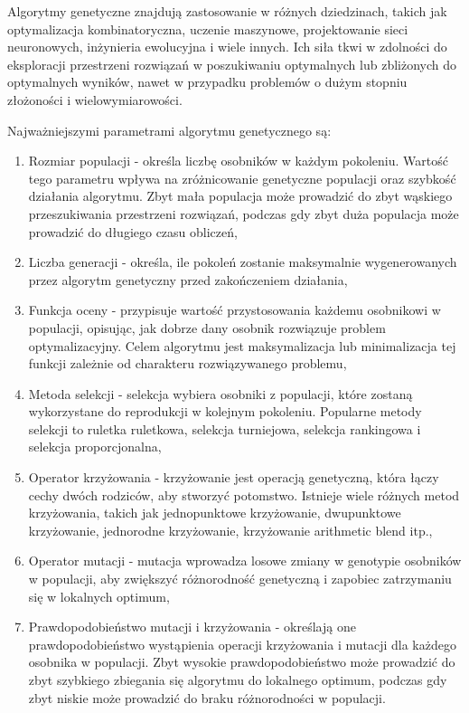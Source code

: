 \documentclass[12pt,twoside]{article}
\begin{document}
Algorytmy genetyczne znajdują zastosowanie w różnych dziedzinach, takich jak optymalizacja kombinatoryczna, uczenie maszynowe, projektowanie sieci neuronowych, inżynieria ewolucyjna i wiele innych. Ich siła tkwi w zdolności do eksploracji przestrzeni rozwiązań w poszukiwaniu optymalnych lub zbliżonych do optymalnych wyników, nawet w przypadku problemów o dużym stopniu złożoności i wielowymiarowości.

Najważniejszymi parametrami algorytmu genetycznego są:
\begin{enumerate}[label=\alph*), leftmargin=1.25cm]
	\item Rozmiar populacji - określa liczbę osobników w każdym pokoleniu. Wartość tego parametru wpływa na zróżnicowanie genetyczne populacji oraz szybkość działania algorytmu. Zbyt mała populacja może prowadzić do zbyt wąskiego przeszukiwania przestrzeni rozwiązań, podczas gdy zbyt duża populacja może prowadzić do długiego czasu obliczeń,
	
	\item Liczba generacji - określa, ile pokoleń zostanie maksymalnie wygenerowanych przez algorytm genetyczny przed zakończeniem działania,
	
	\item Funkcja oceny - przypisuje wartość przystosowania każdemu osobnikowi w populacji, opisując, jak dobrze dany osobnik rozwiązuje problem optymalizacyjny. Celem algorytmu jest maksymalizacja lub minimalizacja tej funkcji zależnie od charakteru rozwiązywanego problemu,
	
	\item Metoda selekcji - selekcja wybiera osobniki z populacji, które zostaną wykorzystane do reprodukcji w kolejnym pokoleniu. Popularne metody selekcji to ruletka ruletkowa, selekcja turniejowa, selekcja rankingowa i selekcja proporcjonalna,
	
	\item Operator krzyżowania - krzyżowanie jest operacją genetyczną, która łączy cechy dwóch rodziców, aby stworzyć potomstwo. Istnieje wiele różnych metod krzyżowania, takich jak jednopunktowe krzyżowanie, dwupunktowe krzyżowanie, jednorodne krzyżowanie, krzyżowanie arithmetic blend itp.,
	
	\item Operator mutacji - mutacja wprowadza losowe zmiany w genotypie osobników w populacji, aby zwiększyć różnorodność genetyczną i zapobiec zatrzymaniu się w lokalnych optimum,
	
	\item Prawdopodobieństwo mutacji i krzyżowania - określają one prawdopodobieństwo wystąpienia operacji krzyżowania i mutacji dla każdego osobnika w populacji. Zbyt wysokie prawdopodobieństwo może prowadzić do zbyt szybkiego zbiegania się algorytmu do lokalnego optimum, podczas gdy zbyt niskie może prowadzić do braku różnorodności w populacji.
	
\end{enumerate}
\end{document}
